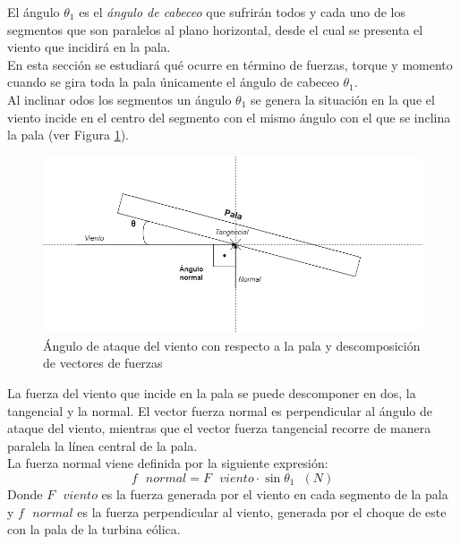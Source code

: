 El ángulo $ \theta_1 $ es el \textit{ángulo de cabeceo} que sufrirán todos y cada uno de los segmentos que son paralelos al plano horizontal, desde el cual se presenta el viento que incidirá en la pala.\\


En esta sección se estudiará qué ocurre en término de fuerzas, torque y momento cuando se gira toda la pala únicamente el ángulo de cabeceo $ \theta_1 $. \\


Al inclinar odos los segmentos un ángulo $ \theta_1 $ se genera la situación en la que el viento incide en el centro del segmento con el mismo ángulo con el que se inclina la pala (ver Figura \ref{fig:dibujo_fuerzas}). \\

\begin{figure}[H]
    \centering
    \includegraphics[width=1\textwidth]{images/dibujo fuerzas.drawio.png}
    \caption{Ángulo de ataque del viento con respecto a la pala y descomposición de vectores de fuerzas}
    
    \label{fig:dibujo_fuerzas}
\end{figure}

La fuerza del viento que incide en la pala se puede descomponer en dos, la tangencial y la normal. El vector fuerza normal es perpendicular al ángulo de ataque del viento, mientras que el vector fuerza tangencial recorre de manera paralela la línea central de la pala.\\

 La fuerza normal viene definida por la siguiente expresión:
 \begin{equation}
   f \text{ } normal = F \text{ } viento \cdot \sin{\theta_1} \hspace{7pt} (N)
 \label{def:fuerza_normal}
 \end{equation}
 Donde $F \text{ } viento$ es la fuerza generada por el viento en cada segmento de la pala y $f \text{ } normal$ es la fuerza perpendicular al viento, generada por el choque de este con la pala de la turbina eólica.\\


